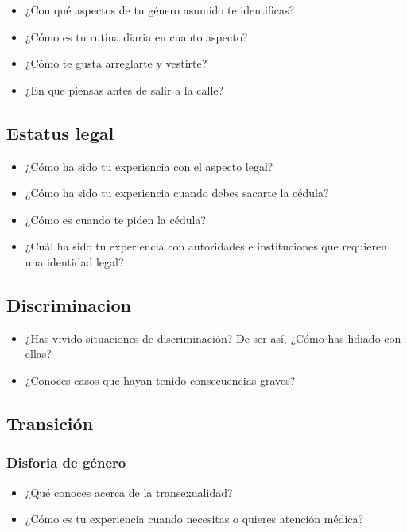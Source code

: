\begin{itemize}
\item
  ¿Con qué aspectos de tu género asumido te identificas?
\item
  ¿Cómo es tu rutina diaria en cuanto aspecto?
\item
  ¿Cómo te gusta arreglarte y vestirte?
\item
  ¿En que piensas antes de salir a la calle?
\end{itemize}

\subsection{Estatus legal}

\begin{itemize}
\item
  ¿Cómo ha sido tu experiencia con el aspecto legal?
\item
  ¿Cómo ha sido tu experiencia cuando debes sacarte la cédula?
\item
  ¿Cómo es cuando te piden la cédula?
\item
  ¿Cuál ha sido tu experiencia con autoridades e instituciones que
  requieren una identidad legal?
\end{itemize}

\subsection{Discriminacion}

\begin{itemize}
\item
  ¿Has vivido situaciones de discriminación? De ser así, ¿Cómo has
  lidiado con ellas?
\item
  ¿Conoces casos que hayan tenido consecuencias graves?
\end{itemize}

\subsection{Transición}
\subsubsection{Disforia de género}

\begin{itemize}
\item
  ¿Qué conoces acerca de la transexualidad?
\item
  ¿Cómo es tu experiencia cuando necesitas o quieres atención médica?
\end{itemize}

